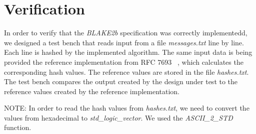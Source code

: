 \documentclass[%
	a4paper,
]
{article}
\begin{document}
%
%
%
%
\section{Verification}
\label{sec:verification}

In order to verify that the \emph{BLAKE2b} specification was correctly
implementedd, we designed a test bench that reads input from a file
\emph{messages.txt} line by line.
%
Each line is hashed by the implemented algorithm. The same input
data is being provided the reference implementation from RFC 7693~%
\autocite{rfc7693}, which calculates the corresponding hash values. The
reference values are stored in the file \emph{hashes.txt}.
%
The test bench compares the output created by the design under test to
the reference values created by the reference implementation.
%

NOTE: In order to read the hash values from \emph{hashes.txt}, we need to
convert the values from hexadecimal to \emph{std_logic_vector}. We used the
\emph{ASCII_2_STD} function.

\end{document}
